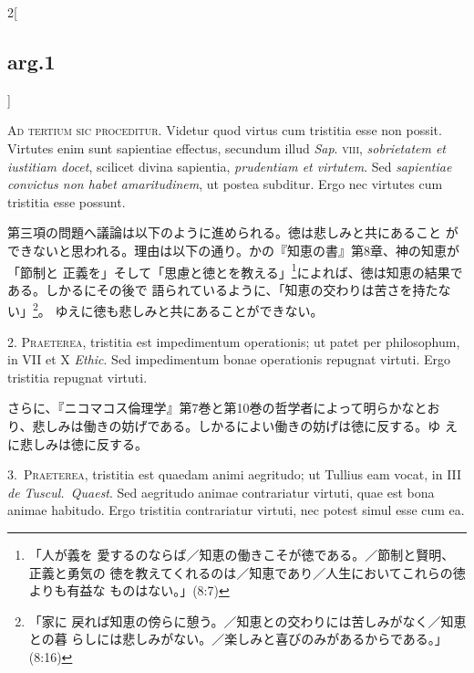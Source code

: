 \documentclass[paper=a4paper,fontsize=10pt,jafontsize=9pt,titlepage]{jlreq}
\begin{document}
\begin{paracol}{2}[\subsection{arg.1}]

{\scshape Ad tertium sic proceditur}. Videtur quod virtus cum
tristitia esse non possit. Virtutes enim sunt sapientiae effectus,
secundum illud {\itshape Sap}. {\scshape viii}, {\itshape sobrietatem
et iustitiam docet}, scilicet divina sapientia, {\itshape prudentiam
et virtutem}. Sed {\itshape sapientiae convictus non habet
amaritudinem}, ut postea subditur. Ergo nec virtutes cum tristitia
esse possunt.

\switchcolumn

第三項の問題へ議論は以下のように進められる。徳は悲しみと共にあること
 ができないと思われる。理由は以下の通り。かの『知恵の書』第8章、神の知恵が「節制と
 正義を」そして「思慮と徳とを教える」\footnote{「人が義を
 愛するのならば／知恵の働きこそが徳である。／節制と賢明、正義と勇気の
 徳を教えてくれるのは／知恵であり／人生においてこれらの徳よりも有益な
 ものはない。」(8:7)}によれば、徳は知恵の結果である。しかるにその後で
 語られているように、「知恵の交わりは苦さを持たない」\footnote{「家に
 戻れば知恵の傍らに憩う。／知恵との交わりには苦しみがなく／知恵との暮
 らしには悲しみがない。／楽しみと喜びのみがあるからである。」(8:16)}。
 ゆえに徳も悲しみと共にあることができない。


2. {\scshape Praeterea}, tristitia est impedimentum operationis; ut
patet per philosophum, in VII et X {\itshape Ethic}. Sed impedimentum
bonae operationis repugnat virtuti. Ergo tristitia repugnat virtuti.

\switchcolumn

さらに、『ニコマコス倫理学』第7巻と第10巻の哲学者によって明らかなとお
 り、悲しみは働きの妨げである。しかるによい働きの妨げは徳に反する。ゆ
 えに悲しみは徳に反する。

\switchcolumn*

{\scshape 3.~Praeterea}, tristitia est quaedam animi aegritudo; ut
Tullius eam vocat, in III {\itshape de Tuscul.~Quaest}. Sed aegritudo
animae contrariatur virtuti, quae est bona animae habitudo. Ergo
tristitia contrariatur virtuti, nec potest simul esse cum ea.


\end{paracol}
\end{document}

